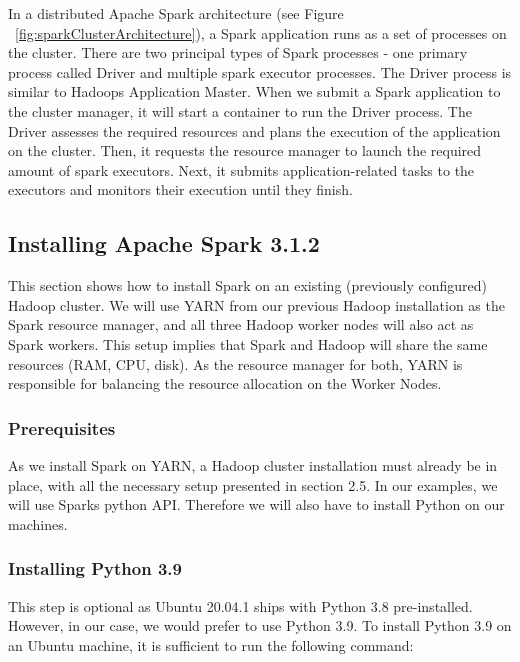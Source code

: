 \documentclass[12pt,english]{book}
\begin{document}

In a distributed Apache Spark architecture (see Figure ~\ref{fig:sparkClusterArchitecture}), a Spark application runs as a set of processes on the cluster.
There are two principal types of Spark processes - one primary process called Driver and multiple spark executor processes.
The Driver process is similar to Hadoops Application Master.
When we submit a Spark application to the cluster manager, it will start a  container to run the Driver process.
The Driver assesses the required resources and plans the execution of the application on the cluster.
Then, it requests the resource manager to launch the required amount of spark executors.
Next, it submits application-related tasks to the executors and monitors their execution until they finish.


\subsection{Installing Apache Spark 3.1.2}


This section shows how to install Spark on an existing (previously configured) Hadoop cluster.
We will use YARN from our previous Hadoop installation as the Spark resource manager, and all three Hadoop worker nodes will also act as Spark workers.
This setup implies that Spark and Hadoop will share the same resources (RAM, CPU, disk).
As the resource manager for both, YARN is responsible for balancing the resource allocation on the Worker Nodes.

\subsubsection{Prerequisites}

As we install Spark on YARN, a Hadoop cluster installation must already be in place, with all the necessary setup presented in section 2.5.
In our examples, we will use Sparks python API.
Therefore we will also have to install Python on our machines.

\subsubsection{Installing Python 3.9}

This step is optional as Ubuntu 20.04.1 ships with Python 3.8 pre-installed.
However, in our case, we would prefer to use Python 3.9.
To install Python 3.9 on an Ubuntu machine, it is sufficient to run the following command:
\end{document}
